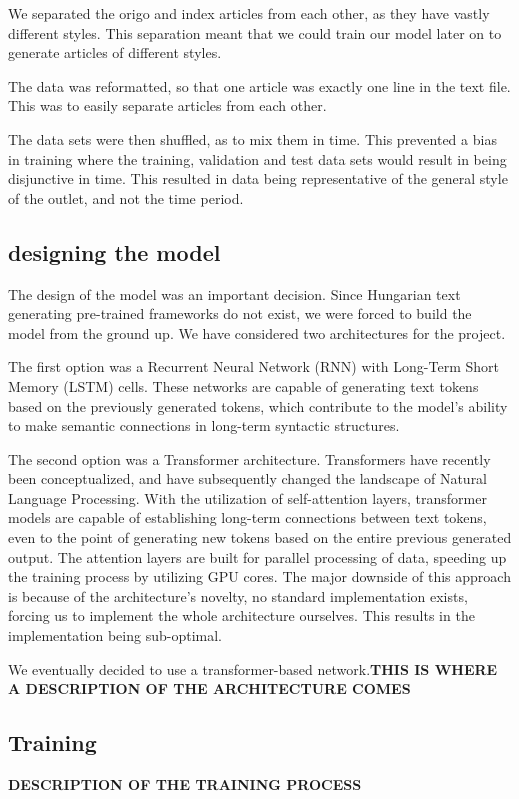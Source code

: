 \documentclass[journal]{IEEEtai}
\begin{document}
We separated the origo and index articles from each other, as they have vastly different styles. This separation meant that we could train our model later on to generate articles of different styles. 

The data was reformatted, so that one article was exactly one line in the text file. This was to easily separate articles from each other.

The data sets were then shuffled, as to mix them in time. This prevented a bias in training where the training, validation and test data sets would result in being disjunctive in time. This resulted in data being representative of the general style of the outlet, and not the time period. 

\subsection{designing the model}
The design of the model was an important decision. Since Hungarian text generating pre-trained frameworks do not exist, we were forced to build the model from the ground up. We have considered two architectures for the project. 

The first option was a Recurrent Neural Network (RNN) with Long-Term Short Memory\cite{lstm} (LSTM) cells. These networks are capable of generating text tokens based on the previously generated tokens, which contribute to the model's ability to make semantic connections in long-term syntactic structures.

The second option was a Transformer\cite{vaswani2017attention} architecture. Transformers have recently been conceptualized, and have subsequently changed the landscape of Natural Language Processing. With the utilization of self-attention layers, transformer models are capable of establishing long-term connections between text tokens, even to the point of generating new tokens based on the entire previous generated output. The attention layers are built for parallel processing of data, speeding up the training process by utilizing GPU cores. The major downside of this approach is because of the architecture's novelty, no standard implementation exists, forcing us to implement the whole architecture ourselves. This results in the implementation being sub-optimal.

We eventually decided to use a transformer-based network.\textbf{THIS IS WHERE A DESCRIPTION OF THE ARCHITECTURE COMES} 

\subsection{Training}
\textbf{DESCRIPTION OF THE TRAINING PROCESS}
\end{document}
